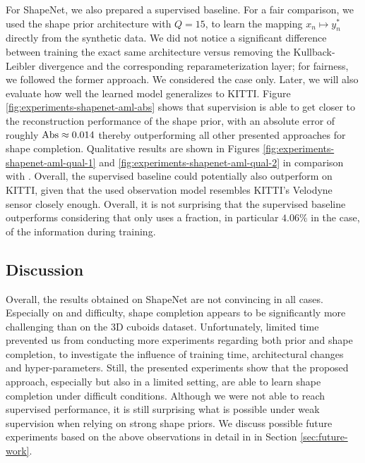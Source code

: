 For ShapeNet, we also prepared a supervised baseline. For a fair comparison,
we used the shape prior architecture with $Q = 15$, to learn the mapping
$x_n \mapsto y_n^*$ directly from the
synthetic data. We did not notice a significant difference between training the
exact same architecture versus removing the
Kullback-Leibler divergence and the corresponding reparameterization layer; for fairness,
we followed the former approach. We considered the \hard case only. Later,
we will also evaluate how well the learned model generalizes to KITTI.
Figure \ref{fig:experiments-shapenet-aml-abs}
shows that supervision is able to get closer to the reconstruction performance
of the shape prior, with an
absolute error of roughly $\text{Abs} \approx 0.014$ thereby outperforming all other
presented approaches for shape completion. Qualitative results are shown in Figures
\ref{fig:experiments-shapenet-aml-qual-1} and \ref{fig:experiments-shapenet-aml-qual-2}
in comparison with \AML. Overall,
the supervised baseline could potentially also outperform \AML on KITTI, given
that the used observation model resembles KITTI's Velodyne sensor closely
enough. Overall, it is not surprising that the supervised baseline outperforms
\AML considering that \AML only uses a fraction, in particular $4.06\%$ in the
\moderate case, of the information during training.

\subsection{Discussion}

Overall, the results obtained on ShapeNet are not convincing in all cases. Especially
on \moderate and \hard difficulty, shape completion appears to be significantly
more challenging than on the 3D cuboids dataset. Unfortunately, limited time prevented us
from conducting more experiments regarding both prior and shape completion, \eg to investigate
the influence of training time, architectural changes and hyper-parameters. 
Still, the presented experiments show that the proposed approach, especially \AML
but also \EVAE in a limited setting,
are able to learn shape completion under difficult conditions.
Although we were not able to reach supervised performance, it is still surprising
what is possible under weak supervision when relying on strong shape priors.
We discuss possible future experiments
based on the above observations in detail in in Section \ref{sec:future-work}.

